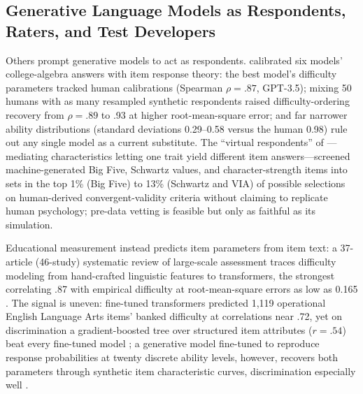 \subsection{Generative Language Models as Respondents, Raters, and Test Developers}

Others prompt generative models to act as respondents. \citet{liu-etal-2025} calibrated six models' college-algebra answers with item response theory: the best model's difficulty parameters tracked human calibrations (Spearman $\rho = .87$, GPT-3.5); mixing 50 humans with as many resampled synthetic respondents raised difficulty-ordering recovery from $\rho = .89$ to .93 at higher root-mean-square error; and far narrower ability distributions (standard deviations 0.29--0.58 versus the human 0.98) rule out any single model as a current substitute. The ``virtual respondents'' of \citet{lim-etal-2025}---mediating characteristics letting one trait yield different item answers---screened machine-generated Big Five, Schwartz values, and character-strength items into sets in the top 1\% (Big Five) to 13\% (Schwartz and VIA) of possible selections on human-derived convergent-validity criteria without claiming to replicate human psychology; pre-data vetting is feasible but only as faithful as its simulation.

Educational measurement instead predicts item parameters from item text: a 37-article (46-study) systematic review of large-scale assessment traces difficulty modeling from hand-crafted linguistic features to transformers, the strongest correlating .87 with empirical difficulty at root-mean-square errors as low as 0.165 \citep{peters-etal-2025}. The signal is uneven: fine-tuned transformers predicted 1{,}119 operational English Language Arts items' banked difficulty at correlations near .72, yet on discrimination a gradient-boosted tree over structured item attributes ($r = .54$) beat every fine-tuned model \citep{han-etal-2025}; a generative model fine-tuned to reproduce response probabilities at twenty discrete ability levels, however, recovers both parameters through synthetic item characteristic curves, discrimination especially well \citep{ormerod-2026}.


